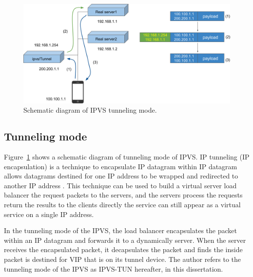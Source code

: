 \begin{figure}[h]
  \centering
  \includegraphics[width=0.9\columnwidth]{Figs/ipvs-tun-schem}

  \par\bigskip
  \centering
  \begin{minipage}{0.9\columnwidth}
    \caption[IPVS tunneling  mode]{
      Schematic diagram of IPVS tunneling mode.
    }
    \label{fig:ipvs-tun-schem}
  \end{minipage}
\end{figure}

\subsection{Tunneling mode}

Figure~\ref{fig:ipvs-tun-schem} shows a schematic diagram of  tunneling mode of IPVS.
IP tunneling (IP encapsulation) is a technique to encapsulate IP datagram within IP datagram
 allows datagrams destined for one IP address to be wrapped and redirected to another IP address \cite{kuznetsov1999tunnels}.
This technique can be used to build a virtual server
 load balancer  the request packets  to the  servers,
and the  servers  process the requests return the results to the clients directly
 the service can still appear as a virtual service on a single IP address.

In the tunneling mode of the IPVS, the load balancer encapsulates the packet within an IP datagram and forwards it to a dynamically  server. 
When the  server receives the encapsulated packet, it decapsulates the packet and finds the inside packet is destined for VIP that is on its tunnel device.
%
The author refers to the tunneling mode of the IPVS as IPVS-TUN hereafter, in this dissertation.


